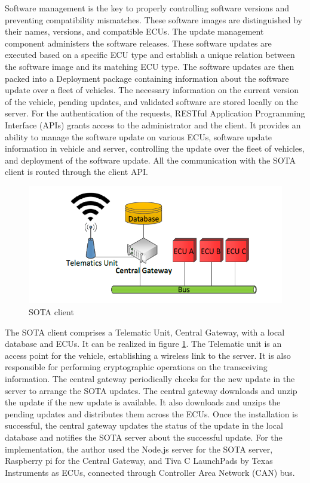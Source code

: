 \documentclass[12pt,a4paper]{article}
\begin{document}
Software management is the key to properly controlling software versions and preventing compatibility mismatches. These software images are distinguished by their names, versions, and compatible ECUs. The update management component administers the software releases. These software updates are executed based on a specific ECU type and establish a unique relation between the software image and its matching ECU type. The software updates are then packed into a Deployment package containing information about the software update over a fleet of vehicles. The necessary information on the current version of the vehicle, pending updates, and validated software are stored locally on the server. For the authentication of the requests, RESTful Application Programming Interface (APIs) grants access to the administrator and the client. It provides an ability to manage the software update on various ECUs, software update information in vehicle and server, controlling the update over the fleet of vehicles, and deployment of the software update. All the communication with the SOTA client is routed through the client API. \cite{r28} \\

\begin{figure}[H]
\centering
\includegraphics[scale=0.75]{sota_client.PNG}
\caption{SOTA client \cite{r28}}
\label{sota_client}
\end{figure}

The SOTA client comprises a Telematic Unit, Central Gateway, with a local database and ECUs. It can be realized in figure \ref{sota_client}. The Telematic unit is an access point for the vehicle, establishing a wireless link to the server. It is also responsible for performing cryptographic operations on the transceiving information. The central gateway periodically checks for the new update in the server to arrange the SOTA updates. The central gateway downloads and unzip the update if the new update is available. It also downloads and unzips the pending updates and distributes them across the ECUs. Once the installation is successful, the central gateway updates the status of the update in the local database and notifies the SOTA server about the successful update. For the implementation, the author used the Node.js server for the SOTA server, Raspberry pi for the Central Gateway, and Tiva C LaunchPads by Texas Instruments as ECUs, connected through Controller Area Network (CAN) bus. \cite{r28} \\
\end{document}
